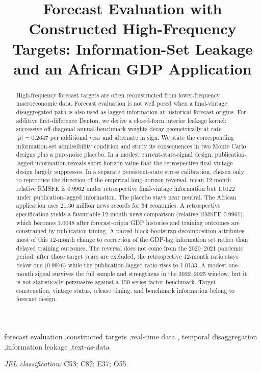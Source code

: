 \documentclass[preprint,12pt,authoryear]{elsarticle}
\begin{document}
\begin{frontmatter}

\title{Forecast Evaluation with Constructed High-Frequency Targets:
Information-Set Leakage and an African GDP Application}

\begin{abstract}
High-frequency forecast targets are often reconstructed from lower-frequency
macroeconomic data. Forecast evaluation is not well posed when a final-vintage
disaggregated path is also used as lagged information at historical forecast
origins. For additive first-difference Denton, we derive a closed-form interior
leakage kernel: successive off-diagonal annual-benchmark weights decay
geometrically at rate $|\mu| = 0.2647$ per additional year and alternate in
sign. We state the corresponding information-set admissibility condition and
study its consequences in two Monte Carlo designs plus a pure-noise placebo. In
a modest current-state-signal design, publication-lagged information reveals
short-horizon value that the retrospective final-vintage design largely
suppresses. In a separate persistent-state stress calibration, chosen only to
reproduce the direction of the empirical long-horizon reversal, mean 12-month
relative RMSFE is 0.9962 under retrospective final-vintage information but
1.0122 under publication-lagged information. The placebo stays near neutral.
The African application uses 21.30 million news records for 54 economies. A
retrospective specification yields a favourable 12-month news comparison
(relative RMSFE 0.9961), which becomes 1.0048 after forecast-origin GDP
histories and training outcomes are constrained by publication timing. A paired
block-bootstrap decomposition attributes most of this 12-month change to
correction of the GDP-lag information set rather than delayed training
outcomes. The reversal does not come from the 2020--2021 pandemic period: after
those target years are excluded, the retrospective 12-month ratio stays below
one (0.9976) while the publication-lagged ratio rises to 1.0133. A modest
one-month signal survives the full sample and strengthens in the 2022--2025
window, but it is not statistically persuasive against a 159-series factor
benchmark. Target construction, vintage status, release timing, and benchmark
information belong to forecast design.
\end{abstract}

\begin{keyword}
forecast evaluation \sep constructed targets \sep real-time data \sep
temporal disaggregation \sep information leakage \sep text-as-data
\par\medskip\textit{JEL classification:} C53; C82; E37; O55.
\end{keyword}
\end{frontmatter}
\singlespacing
\end{document}
